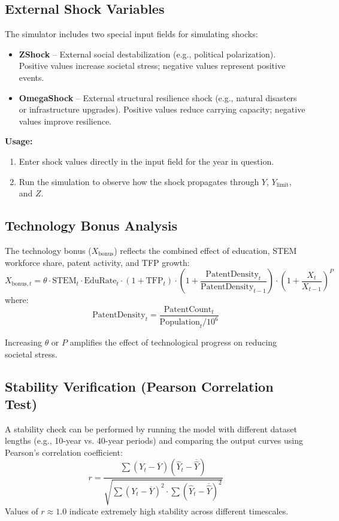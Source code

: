 \documentclass[12pt,a4paper]{article}
\begin{document}
\subsection{External Shock Variables}
The simulator includes two special input fields for simulating shocks:
\begin{itemize}
    \item \textbf{ZShock} – External social destabilization (e.g., political polarization).  
    Positive values increase societal stress; negative values represent positive events.
    \item \textbf{OmegaShock} – External structural resilience shock (e.g., natural disasters or infrastructure upgrades).  
    Positive values reduce carrying capacity; negative values improve resilience.
\end{itemize}

\noindent
\textbf{Usage:}
\begin{enumerate}
    \item Enter shock values directly in the input field for the year in question.
    \item Run the simulation to observe how the shock propagates through \(Y\), \(Y_{\text{limit}}\), and \(Z\).
\end{enumerate}

\subsection{Technology Bonus Analysis}
The technology bonus (\(X_{\text{bonus}}\)) reflects the combined effect of education, STEM workforce share, patent activity, and TFP growth:
\[
X_{\text{bonus},t} = \theta \cdot \text{STEM}_t \cdot \text{EduRate}_t \cdot (1 + \text{TFP}_t) \cdot \left( 1 + \frac{\text{PatentDensity}_t}{\text{PatentDensity}_{t-1}} \right) \cdot \left( 1 + \frac{X_t}{X_{t-1}} \right)^P
\]
where:
\[
\text{PatentDensity}_t = \frac{\text{PatentCount}_t}{\text{Population}_t / 10^6}
\]

\noindent
Increasing \(\theta\) or \(P\) amplifies the effect of technological progress on reducing societal stress.

\subsection{Stability Verification (Pearson Correlation Test)}
A stability check can be performed by running the model with different dataset lengths (e.g., 10-year vs. 40-year periods) and comparing the output curves using Pearson’s correlation coefficient:
\[
r = \frac{\sum (Y_t - \overline{Y})(\hat{Y}_t - \overline{\hat{Y}})}{\sqrt{\sum (Y_t - \overline{Y})^2 \cdot \sum (\hat{Y}_t - \overline{\hat{Y}})^2}}
\]
Values of \(r \approx 1.0\) indicate extremely high stability across different timescales.
\end{document}

